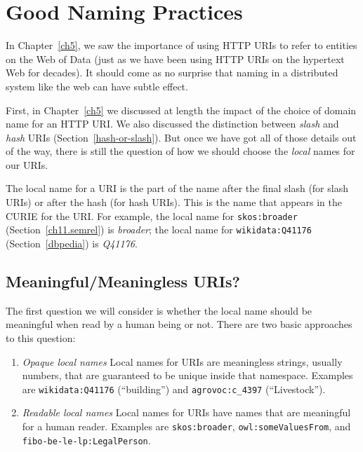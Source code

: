 

\section{Good Naming Practices}
\label{ch15Naming}

In Chapter~\ref{ch5}, we saw the importance of using HTTP URIs to refer to entities
on the Web of Data (just as we have been using HTTP URIs on the hypertext Web for decades).
It should come as no surprise that naming in a distributed system like the web
can have subtle effect. 

First, in Chapter~\ref{ch5} we discussed at length the impact of the choice of 
domain name for an HTTP URI.   We also discussed the distinction between \emph{slash} and 
\emph{hash} URIs (Section~\ref{hash-or-slash}).  But once we have got all of those details 
out of the way, there is still the question of how we should choose the \emph{local} names 
for our URIs. 

The local name for a URI is the part of the name after the final slash (for slash URIs) or 
after the hash (for hash URIs).  This is the name that appears in the CURIE for the URI. 
For example, the local name for \texttt{skos:broader}  (Section~\ref{ch11.semrel}) is 
\emph{broader}; the local name for \texttt{wikidata:Q41176} (Section~\ref{dbpedia}) is 
\emph{Q41176}. 

\subsection{Meaningful/Meaningless URIs?}

The first question we will consider is whether the local name should be meaningful
when read by a human being or not.  There are two basic approaches to this question: 

\begin{enumerate}
    \item \emph{Opaque local names} Local names for URIs are meaningless strings, usually numbers, that are guaranteed to be unique inside that namespace.  Examples are \texttt{wikidata:Q41176} (``building'') and \texttt{agrovoc:c\_4397} (``Livestock''). 
    \item \emph{Readable local names} Local names for URIs have names that are meaningful
    for a human reader.  Examples are \texttt{skos:broader}, \texttt{owl:someValuesFrom}, and \texttt{fibo-be-le-lp:LegalPerson}.
\end{enumerate}

